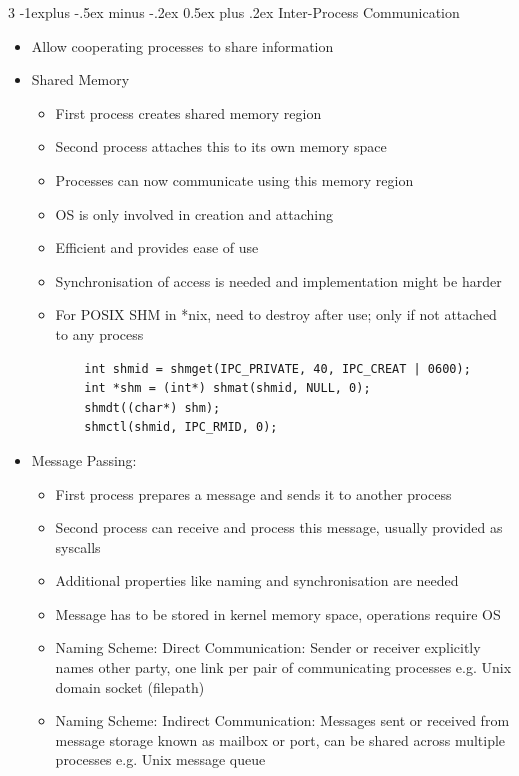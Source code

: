 \documentclass[10pt, landscape]{article}
\makeatletter
\renewcommand{\section}{\@startsection{section}{1}{0mm}%
                                {-1ex plus -.5ex minus -.2ex}%
                                {0.5ex plus .2ex}%
                                {\normalfont\large\bfseries}}
\renewcommand{\section}{\@startsection{section}{2}{0mm}%
                                {-1explus -.5ex minus -.2ex}%
                                {0.5ex plus .2ex}%
                                {\normalfont\normalsize\bfseries}}
\makeatother
\begin{document}
\begin{multicols*}{3}
\section{Inter-Process Communication}
\begin{itemize}
    \item Allow cooperating processes to share information
    \item Shared Memory
    \begin{itemize}
        \item First process creates shared memory region
        \item Second process attaches this to its own memory space
        \item Processes can now communicate using this memory region
        \item OS is only involved in creation and attaching
        \item Efficient and provides ease of use
        \item Synchronisation of access is needed and implementation might be harder
        \item For POSIX SHM in *nix, need to destroy after use; only if not attached to any process
        \begin{verbatim}
    int shmid = shmget(IPC_PRIVATE, 40, IPC_CREAT | 0600);
    int *shm = (int*) shmat(shmid, NULL, 0);
    shmdt((char*) shm);
    shmctl(shmid, IPC_RMID, 0);
        \end{verbatim}
    \end{itemize}
    \item Message Passing:
    \begin{itemize}
        \item First process prepares a message and sends it to another process
        \item Second process can receive and process this message, usually provided as syscalls
        \item Additional properties like naming and synchronisation are needed
        \item Message has to be stored in kernel memory space, operations require OS
        \item Naming Scheme: Direct Communication: Sender or receiver explicitly names other party, one link per pair of communicating processes e.g. Unix domain socket (filepath)
        \item Naming Scheme: Indirect Communication: Messages sent or received from message storage known as mailbox or port, can be shared across multiple processes e.g. Unix message queue

\end{itemize}
\end{itemize}
\end{multicols*}
\end{document}
